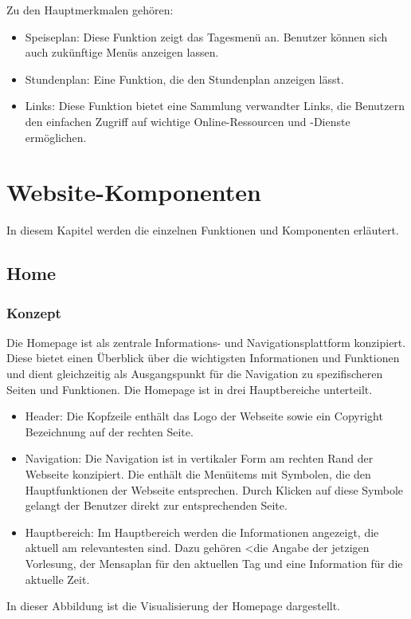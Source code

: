 Zu den Hauptmerkmalen gehören: 
\begin{itemize}
	\item Speiseplan: Diese Funktion zeigt das Tagesmenü an. Benutzer können sich auch zukünftige Menüs anzeigen lassen.
	\item Stundenplan: Eine Funktion, die den Stundenplan anzeigen lässt.
	\item Links: Diese Funktion bietet eine Sammlung verwandter Links, die Benutzern den einfachen Zugriff auf wichtige Online-Ressourcen und -Dienste ermöglichen.
\end{itemize}

\section{Website-Komponenten}
In diesem Kapitel werden die einzelnen Funktionen und Komponenten erläutert.
\subsection{Home}
\subsubsection{Konzept}
Die Homepage ist als zentrale Informations- und Navigationsplattform konzipiert. Diese bietet einen Überblick über die wichtigsten Informationen und Funktionen und dient gleichzeitig als Ausgangspunkt für die Navigation zu spezifischeren Seiten und Funktionen.
Die Homepage ist in drei Hauptbereiche unterteilt.
\begin{itemize}
	\item Header: Die Kopfzeile enthält das Logo der Webseite sowie ein Copyright Bezeichnung auf der rechten Seite. 
	\item Navigation: Die Navigation ist in vertikaler Form am rechten Rand der Webseite konzipiert. Die enthält die Menüitems mit Symbolen, die den Hauptfunktionen der Webseite entsprechen. Durch Klicken auf diese Symbole gelangt der Benutzer direkt zur entsprechenden Seite.
	\item Hauptbereich: Im Hauptbereich werden die Informationen angezeigt, die aktuell am relevantesten sind. Dazu gehören <die Angabe der jetzigen Vorlesung, der Mensaplan für den aktuellen Tag und eine Information für die aktuelle Zeit.
\end{itemize} 
In dieser Abbildung ist die Visualisierung der Homepage dargestellt.

